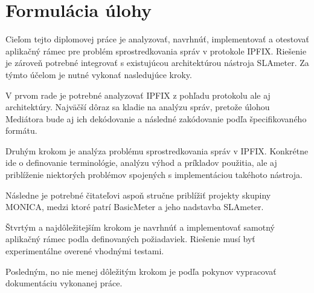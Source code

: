 \section{Formul\'acia \'ulohy}

Cieľom tejto diplomovej práce je analyzovať, navrhnúť, implementovať a otestovať aplikačný rámec 
pre problém sprostredkovania správ v protokole IPFIX. Riešenie je zároveň potrebné integrovať s 
existujúcou architektúrou nástroja SLAmeter. Za týmto účelom je nutné vykonať nasledujúce kroky. 

V prvom rade je potrebné analyzovať IPFIX z pohľadu protokolu ale aj architektúry.
Najväčší dôraz sa kladie na analýzu správ, pretože 
úlohou Mediátora bude aj ich dekódovanie a následné zakódovanie podľa špecifikovaného formátu.

Druhým krokom je analýza problému sprostredkovania správ v IPFIX. Konkrétne ide o definovanie terminológie,
analýzu výhod a príkladov použitia, ale aj priblíženie niektorých problémov spojených s implementáciou 
takéhoto nástroja.

Následne je potrebné čitateľovi aspoň stručne priblížiť projekty skupiny MONICA, medzi ktoré patrí
BasicMeter a jeho nadstavba SLAmeter. 

Štvrtým a najdôležitejším krokom je navrhnúť a implementovať samotný aplikačný rámec podla definovaných 
požiadaviek. Riešenie musí byť experimentálne overené vhodnými testami.

Posledným, no nie menej dôležitým krokom je podľa pokynov vypracovať dokumentáciu vykonanej práce.

